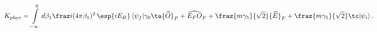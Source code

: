 \begin{equation}
K_{\rm phys}=\int\limits_{-\infty}^0 d\beta_1 \fraz
i{(4\pi\beta_1)^2}\,\esp{iE_B}\,\langle\psi_f|\gamma_0\ta {\widehat
O}_F+{\widehat{E_FO}}_F+\fraz{m\gamma_5}{\sqrt{2}}{\widehat
 E}_F+
\fraz{m\gamma_5}{\sqrt{2}}\tc |\psi_i\rangle\,.
\label{gamma5}
\end{equation}

